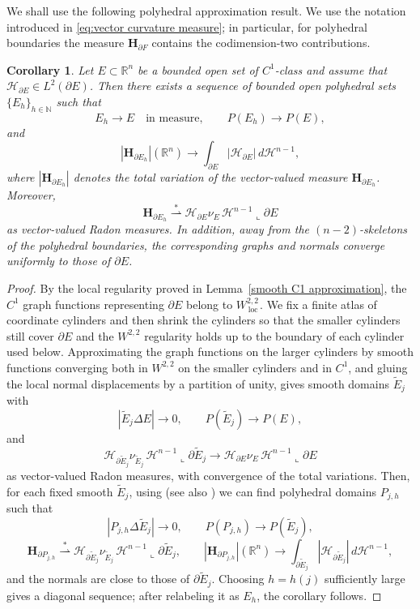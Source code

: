 \documentclass[reqno,11pt]{amsart}
\makeatletter
\def\loc{{\mathop\mathrm{\,loc\,}}}
\newcommand{\R}{\mathbb R}
\newtheorem{cor}[thm]{Corollary}%
\numberwithin{equation}{section}
\theoremstyle{remark}
\makeatother
\begin{document}
We shall use the following polyhedral approximation result.
We use the notation introduced in \eqref{eq:vector curvature measure}; in
particular, for polyhedral boundaries the measure $\mathbf H_{\partial F}$
contains the codimension-two contributions.

\begin{cor}\label{cor:smooth polyhedral approximation}
Let $E\subset \R^n$ be a bounded open set of $C^1$-class and assume that
$\mathcal H_{\partial E}\in L^2(\partial E)$. Then there exists a sequence of
bounded open polyhedral sets $\{E_h\}_{h\in\mathbb N}$ such that
\[
E_h\to E\quad\text{in measure},\qquad P(E_h)\to P(E),
\]
and
\[
|\mathbf H_{\partial E_h}|(\R^n)\to
\int_{\partial E} |\mathcal H_{\partial E}|\,d\mathscr H^{n-1},
\]
where  $|\mathbf H_{\partial E_h}|$ denotes the total variation of the vector-valued measure $\mathbf H_{\partial E_h}$.
Moreover,
\[
\mathbf H_{\partial E_h}\stackrel{*}{\rightharpoonup}
\mathcal H_{\partial E}\nu_E\,\mathscr H^{n-1}\llcorner\partial E
\]
as vector-valued Radon measures. In addition, away from the
$(n-2)$-skeletons of the polyhedral boundaries, the corresponding graphs and
normals converge uniformly to those of $\partial E$.
\end{cor}


 

\begin{proof}
By the local regularity proved in Lemma~\ref{smooth C1 approximation}, the $C^1$ graph functions representing $\partial E$ belong to $W^{2,2}_{\loc}$. We fix a finite atlas of coordinate cylinders and then shrink the cylinders so that the smaller cylinders still cover $\partial E$ and the $W^{2,2}$ regularity holds up to the boundary of each cylinder used below. Approximating the graph functions on the larger cylinders by smooth functions converging both in $W^{2,2}$ on the smaller cylinders and in $C^1$, and gluing the local normal displacements by a partition of unity, gives smooth domains $\widetilde E_j$ with
$$
|\widetilde E_j\Delta E|\to 0,\qquad P(\widetilde E_j)\to P(E),
$$
and
$$
 \mathcal H_{\partial \widetilde E_j}\nu_{\widetilde E_j}\,\mathscr H^{n-1}\llcorner\partial \widetilde E_j
 \to
 \mathcal H_{\partial E}\nu_E\,\mathscr H^{n-1}\llcorner\partial E
$$
as vector-valued Radon measures, with convergence of the total variations. 
Then, for each fixed smooth $\widetilde E_j$, using \cite{BGM2010} (see also \cite{Fu1993,CSM2006}) we can find polyhedral domains $P_{j,h}$ such that
$$
|P_{j,h}\Delta \widetilde E_j|\to 0,\qquad P(P_{j,h})\to P(\widetilde E_j),
$$
$$
\mathbf H_{\partial P_{j,h}}\stackrel{*}{\rightharpoonup}
\mathcal H_{\partial \widetilde E_j}\nu_{\widetilde E_j}\,\mathscr H^{n-1}\llcorner\partial \widetilde E_j,
\qquad
|\mathbf H_{\partial P_{j,h}}|(\R^n)\to
\int_{\partial \widetilde E_j}|\mathcal H_{\partial \widetilde E_j}|\,d\mathscr H^{n-1},
$$
and the normals are close to those of $\partial \widetilde E_j.$
Choosing $h=h(j)$ sufficiently large gives a diagonal sequence; after
relabeling it as $E_h$, the corollary follows.
\end{proof}
\end{document}
